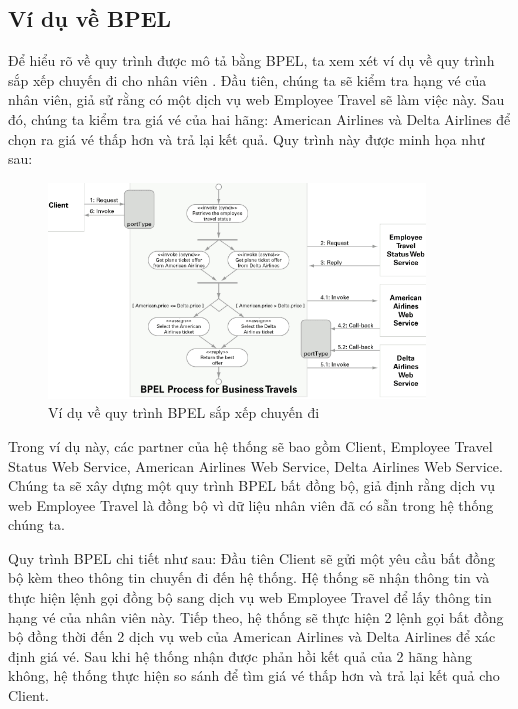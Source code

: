 \subsection{Ví dụ về BPEL}
 
\hspace*{0.5cm} Để hiểu rõ về quy trình được mô tả bằng BPEL, ta xem xét ví dụ về quy trình sắp xếp chuyến đi cho nhân viên \cite{theoryBPEL}. Đầu tiên, chúng ta sẽ kiểm tra hạng vé của nhân viên, giả sử rằng có một dịch vụ web Employee Travel sẽ làm việc này. Sau đó, chúng ta kiểm tra giá vé của hai hãng: American Airlines và Delta Airlines để chọn ra giá vé thấp hơn và trả lại kết quả. Quy trình này được minh họa như sau:
 
\begin{figure}[!htp]
    \begin{center}
        \includegraphics[width=10cm]{img/theory/BPEL/Sample.png}
    \end{center}
    \caption{Ví dụ về quy trình BPEL sắp xếp chuyến đi \cite{theoryBPEL}}
\end{figure}

Trong ví dụ này, các partner của hệ thống sẽ bao gồm Client, Employee Travel Status Web Service, American Airlines Web Service, Delta Airlines Web Service. Chúng ta sẽ xây dựng một quy trình BPEL bất đồng bộ, giả định rằng dịch vụ web Employee Travel là đồng bộ vì dữ liệu nhân viên đã có sẵn trong hệ thống chúng ta.
 
Quy trình BPEL chi tiết như sau: Đầu tiên Client sẽ gửi một yêu cầu bất đồng bộ kèm theo thông tin chuyến đi đến hệ thống. Hệ thống sẽ nhận thông tin và thực hiện lệnh gọi đồng bộ sang dịch vụ web Employee Travel để lấy thông tin hạng vé của nhân viên này. Tiếp theo, hệ thống sẽ thực hiện 2 lệnh gọi bất đồng bộ đồng thời đến 2 dịch vụ web của American Airlines và Delta Airlines để xác định giá vé. Sau khi hệ thống nhận được phản hồi kết quả của 2 hãng hàng không, hệ thống thực hiện so sánh để tìm giá vé thấp hơn và trả lại kết quả cho Client.

